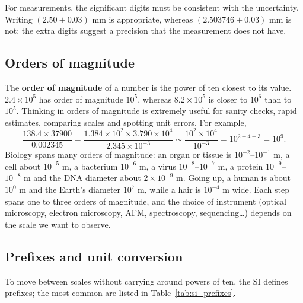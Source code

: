 \documentclass[letterpaper,11pt,leqno]{book}
\begin{document}
For measurements, the significant digits must be consistent with the uncertainty. Writing $(2.50 \pm 0.03)\text{ mm}$ is appropriate, whereas $(2.503746 \pm 0.03)\text{ mm}$ is not: the extra digits suggest a precision that the measurement does not have.

\subsection{Orders of magnitude}

The \textbf{order of magnitude} of a number is the power of ten closest to its value. $2.4 \times 10^5$ has order of magnitude $10^5$, whereas $8.2 \times 10^5$ is closer to $10^6$ than to $10^5$. Thinking in orders of magnitude is extremely useful for sanity checks, rapid estimates, comparing scales and spotting unit errors. For example,
\begin{equation}
\frac{138.4 \times 37900}{0.002345} = \frac{1.384 \times 10^2 \times 3.790 \times 10^4}{2.345 \times 10^{-3}} \sim \frac{10^2 \times 10^4}{10^{-3}} = 10^{2+4+3} = 10^9.
\label{eq:order_practice_calc}
\end{equation}
Biology spans many orders of magnitude: an organ or tissue is $10^{-2}$--$10^{-1}\text{ m}$, a cell about $10^{-5}\text{ m}$, a bacterium $10^{-6}\text{ m}$, a virus $10^{-8}$--$10^{-7}\text{ m}$, a protein $10^{-9}$--$10^{-8}\text{ m}$ and the DNA diameter about $2 \times 10^{-9}\text{ m}$. Going up, a human is about $10^0\text{ m}$ and the Earth's diameter $10^7\text{ m}$, while a hair is $10^{-4}\text{ m}$ wide. Each step spans one to three orders of magnitude, and the choice of instrument (optical microscopy, electron microscopy, AFM, spectroscopy, sequencing\dots) depends on the scale we want to observe.

\subsection{Prefixes and unit conversion}

To move between scales without carrying around powers of ten, the SI defines prefixes; the most common are listed in Table~\ref{tab:si_prefixes}.
\end{document}
